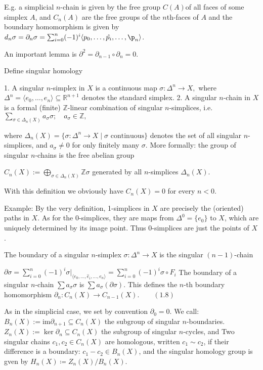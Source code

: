 E.g. a simplicial \(n\)-chain is given by the free group \( C(A) \)of all faces of some simplex \( A \), and \( C_n(A) \) are the free groups of the \(n\)th-faces of \( A \)
and the boundary homomorphism is given by \( d_n\sigma = \partial_n \sigma = \sum_{i=0}^n (-1)^i \langle p_0, \dots, \hat{p_i}, \dots, \p_n \rangle \).

An important lemma is \( \partial^2 = \partial_{n-1} \circ \partial_n = 0 \).

Define singular homology

1. A singular \(n\)-simplex in \(X\) is a continuous map
\(\sigma: \Delta^n \to X,\)
where \(\Delta^n = \langle e_0, \dots, e_n \rangle \subseteq \mathbb{R}^{n+1}\) denotes the standard simplex.
2. A singular \(n\)-chain in \(X\) is a formal (finite) \(\mathbb{Z}\)-linear combination of singular \(n\)-simplices, i.e.
\(\sum_{\sigma \in \Delta_n(X)} a_\sigma \sigma; \quad a_\sigma \in \mathbb{Z}, \)

where \(\Delta_n(X) = \{\sigma: \Delta^n \to X \mid \sigma \text{ continuous}\}\) denotes the set of all singular \(n\)-simplices, and \(a_\sigma \neq 0\) for only finitely many \(\sigma\). 
More formally: the group of singular \(n\)-chains is the free abelian group

\(C_n(X) := \bigoplus_{\sigma \in \Delta_n(X)} \mathbb{Z} \sigma \)
generated by all \(n\)-simplices \(\Delta_n(X)\).

With this definition we obviously have \(C_n(X) = 0\) for every \(n < 0\).

Example: By the very definition, 1-simplices in \(X\) are precisely the (oriented) paths in \(X\). As for the 0-simplices, they are maps from \(\Delta^0 = \{e_0\}\) to \(X\), which are uniquely determined by its image point. Thus 0-simplices are just the points of \(X\). 

The boundary of a singular \(n\)-simplex \(\sigma: \Delta^n \to X\) is the singular \((n-1)\)-chain 

\(\partial \sigma = \sum_{i=0}^{n} (-1)^i \sigma|_{\langle e_0, \dots, \hat{e}_i, \dots, e_n \rangle} = \sum_{i=0}^{n} (-1)^i \sigma \circ F_i\)
The boundary of a singular \(n\)-chain \(\sum a_\sigma \sigma\) is \(\sum a_\sigma (\partial \sigma)\). This defines the \(n\)-th boundary homomorphism
\(\partial_n : C_n(X) \to C_{n-1}(X). \qquad (1.8)\)

As in the simplicial case, we set by convention \(\partial_0 = 0\). 
We call:
\(B_n(X) := \text{im} \partial_{n+1} \subseteq C_n(X)\) the subgroup of singular \(n\)-boundaries.
\(Z_n(X) := \ker \partial_n \subseteq C_n(X)\) the subgroup of singular \(n\)-cycles, and
Two singular chains \(c_1, c_2 \in C_n(X)\) are homologous, written \(c_1 \sim c_2\), if their difference is a boundary: \(c_1 - c_2 \in B_n(X)\),
and the singular homology group is gven by \( H_n(X) \coloneqq Z_n(X)/B_n(X) \).

